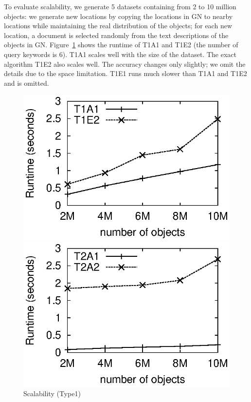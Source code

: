 \documentclass{sig-alternate}
\begin{document}
 To evaluate scalability, we generate 5
datasets containing from 2 to 10 million objects: we generate new
locations by copying the locations in \textsf{GN} to nearby
locations while maintaining the real distribution of the objects;
for each new location, a document is selected randomly from the text
descriptions of the objects in \textsf{GN}.
%
Figure~\ref{fig:scalability1} shows the runtime of T1A1 and
T1E2 (the number of query keywords is 6). T1A1 scales well
with the size of the dataset. The exact algorithm T1E2 also scales well.
%
The accuracy changes only slightly; we omit the details due to the
space limitation. T1E1 runs much slower than T1A1 and T1E2 and is omitted.

\begin{figure}[h]
\vspace{-1ex}
\begin{minipage}[bt]{1.6in}
 \includegraphics[scale=0.5]{figure/scalability1}\vspace{-2ex}
\caption{Scalability (Type1)} \label{fig:scalability1}
\end{minipage}\hspace{2mm}
\begin{minipage}[bt]{1.6in}
 \includegraphics[scale=0.5]{figure/scalability2}\vspace{-2ex}

\end{minipage}
\end{figure}
\end{document}
